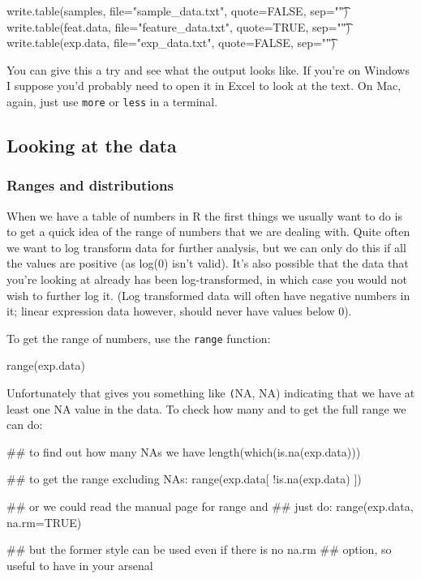 \documentclass[11pt]{article}
\begin{document}
\begin{rcode}
  write.table(samples, file="sample_data.txt", quote=FALSE, sep="\t")
  write.table(feat.data, file="feature_data.txt", quote=TRUE, sep="\t")
  write.table(exp.data, file="exp_data.txt", quote=FALSE, sep="\t")
\end{rcode}

You can give this a try and see what the output looks like. If you're on
Windows I suppose you'd probably need to open it in Excel to look at
the text. On Mac, again, just use \texttt{more} or \texttt{less} in
a terminal.

\subsection{Looking at the data}
\label{sec-1-3}

\subsubsection{Ranges and distributions}
\label{sec-1-3-1}

When we have a table of numbers in R the first things we usually want
to do is to get a quick idea of the range of numbers that we are dealing
with. Quite often we want to log transform data for further analysis,
but we can only do this if all the values are positive (as log(0) isn't
valid). It's also possible that the data that you're looking at already
has been log-transformed, in which case you would not wish to further
log it. (Log transformed data will often have negative numbers in it;
linear expression data however, should never have values below 0).

To get the range of numbers, use the \texttt{range} function:

\begin{rcode}
range(exp.data)
\end{rcode}

Unfortunately that gives you something like \texttt(NA, NA) indicating that
we have at least one NA value in the data. To check how many and
to get the full range we can do:

\begin{rcode}
## to find out how many NAs we have
length(which(is.na(exp.data)))

## to get the range excluding NAs:
range(exp.data[ !is.na(exp.data) ])

## or we could read the manual page for range and
## just do:
range(exp.data, na.rm=TRUE)

## but the former style can be used even if there is no na.rm
## option, so useful to have in your arsenal
\end{rcode}
\end{document}
